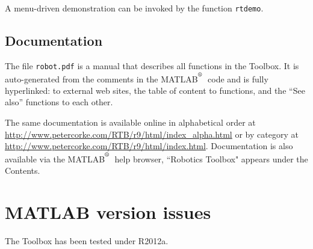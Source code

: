 \documentclass[a4paper]{report}
\def\Mlab{MATLAB$^{\textsuperscript{\textregistered}}$}
\begin{document}
A menu-driven demonstration can be invoked by the function {\tt rtdemo}.

\subsection{Documentation}
The file {\tt robot.pdf} is a manual that describes all functions in the Toolbox.
It is auto-generated from the comments in the \Mlab\ code and is fully hyperlinked:
to external web sites, the table of content to functions, and the ``See also'' functions
to each other.

The same documentation is available online in
alphabetical order at \url{http://www.petercorke.com/RTB/r9/html/index_alpha.html}
or by category at \url{http://www.petercorke.com/RTB/r9/html/index.html}.
Documentation is also available via the \Mlab\ help browser, ``Robotics
Toolbox" appears under the Contents.


\section{MATLAB version issues}
The Toolbox has been tested under R2012a.
\end{document}

